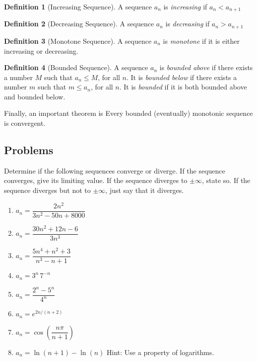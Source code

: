 \documentclass[12pt,letterpaper,fleqn]{article}
\theoremstyle{definition}
\newtheorem*{definition}{Definition}
\begin{document}
\theoremstyle{definition}
\begin{definition}[Increasing Sequence]
  A sequence $a_n$ is \emph{increasing} if $a_n < a_{n+1}$
\end{definition}
\begin{definition}[Decreasing Sequence]
  A sequence $a_n$ is \emph{decreasing} if $a_n > a_{n+1}$
\end{definition}
\begin{definition}[Monotone Sequence]
  A sequence $a_n$ is \emph{monotone} if it is either increasing or decreasing.
\end{definition}
\begin{definition}[Bounded Sequence]
  A sequence $a_n$ is \emph{bounded above} if there exists a number $M$ such that $a_n \leq M$, for all $n$. It is \emph{bounded below} if there exists a number $m$ such that $m \leq a_n$, for all $n$. It is \emph{bounded} if it is both bounded above and bounded below.
\end{definition}
Finally, an important theorem is
 Every bounded (eventually) monotonic sequence is convergent.
\newpage
\subsection*{Problems}
Determine if the following sequences converge or diverge. If the sequence converges, give its limiting value. If the sequence diverges to $\pm\infty$, state so. If the sequence diverges but not to $\pm\infty$, just say that it diverges.
\begin{enumerate}
  \item $a_n = \dfrac{2n^2}{3n^2-50n+8000}$
  \item $a_n = \dfrac{30n^2+12n-6}{3n^3}$
  \item $a_n = \dfrac{5n^4+n^2+3}{n^3-n+1}$
  \item $a_n = 3^n\,7^{-n}$
  \item $a_n = \dfrac{2^n - 5^n}{4^n}$
  \item $a_n = e^{2n/(n+2)}$
  \item $a_n = \cos\left(\dfrac{n\pi}{n+1}\right)$
  \item $a_n = \ln(n+1) - \ln(n)$ Hint: Use a property of logarithms.
\end{enumerate}
\end{document}
